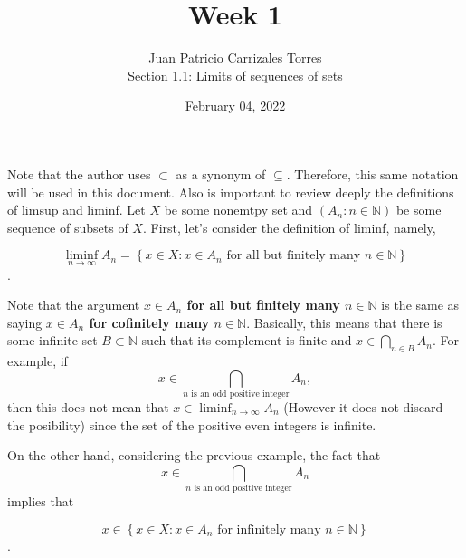 \documentclass[12pt]{article}
\begin{document}
	
	\title{Week 1}
	\author{Juan Patricio Carrizales Torres \\
		Section 1.1: Limits of sequences of sets}
	\date{February 04, 2022}
	\maketitle
	
	Note that the author uses $\subset$ as a synonym of $\subseteq$. Therefore, this same notation will be used in this document. Also is important to review deeply the definitions of limsup and liminf.
Let $X$ be some nonemtpy set and $\left(A_{n}:n\in \mathbb{N}\right)$ be some sequence of subsets of $X$. First, let's consider the definition of liminf, namely,

$$\liminf_{n\to \infty}A_{n} = \left\{x \in X:x \in A_{n} \text{ for all but finitely many } n \in \mathbb{N}\right\}$$. 

Note that the argument \textbf{$x\in A_{n}$ for all but finitely many $n \in \mathbb{N}$} is the same as saying \textbf{$x\in A_{n}$ for cofinitely many $n \in \mathbb{N}$}. Basically, this means that there is some infinite set $B \subset \mathbb{N}$ such that its complement is finite and $x\in \bigcap_{n\in B} A_{n}$. For example, if 
$$x\in \bigcap_{n \text{ is an odd positive integer}} A_{n},$$ then this does not mean that $x\in \liminf_{n \to \infty} A_{n}$ (However it does not discard the posibility) since the set of the positive even integers is infinite. 
 
On the other hand, considering the previous example, the fact that $$x\in \bigcap_{n \text{ is an odd positive integer}} A_{n}$$ implies that 

$$x\in \left\{x \in X:x \in A_{n} \text{ for infinitely many } n \in \mathbb{N}\right\}$$. 
\end{document}
